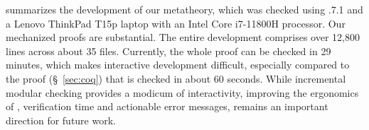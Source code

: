  summarizes the development 
of our metatheory,
which was checked using .7.1
and a Lenovo ThinkPad T15p laptop with
an Intel Core i7-11800H processor.
%
Our mechanized proofs are substantial. The entire
\lh development comprises over 12,800 lines 
across about 35 files. 
%
Currently, the whole \lh proof can be checked
in 29 minutes, which makes interactive
development difficult, especially compared to 
the \coq proof (\S~\ref{sec:coq}) that 
is checked in about 60 seconds.
%
While incremental modular checking provides
a modicum of interactivity, improving the
ergonomics of \lh, 
\ie verification time and 
actionable error messages, remains an important
direction for future work.

